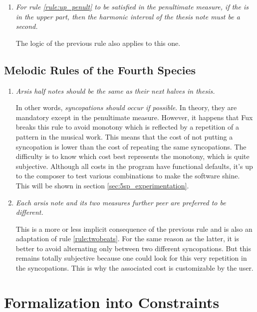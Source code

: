 \begin{enumerate}[wide, label=\bfseries 4.H\arabic*]
    \item\label{rule:uppenult4th} \textit{For rule \ref{rule:up_penult} to be satisfied in the penultimate measure, if the \cf is in the upper part, then the harmonic interval of the thesis note must be a second.}
    
    The logic of the previous rule also applies to this one.
\end{enumerate}

\subsection{Melodic Rules of the Fourth Species}
\begin{enumerate}[wide, label=\bfseries 4.M\arabic*]
    \item\label{rule:fullsyncopations} \textit{Arsis half notes should be the same as their next halves in thesis.}
    
    In other words, \textit{syncopations should occur if possible}. In theory, they are mandatory except in the penultimate measure. However, it happens that Fux breaks this rule to avoid monotony which is reflected by a repetition of a pattern in the musical work. This means that the cost of not putting a syncopation is lower than the cost of repeating the same syncopations. The difficulty is to know which cost best represents the monotony, which is quite subjective. Although all costs in the program have functional defaults, it's up to the composer to test various combinations to make the software shine. This will be shown in section \ref{sec:5sp_experimentation}.

    \item\label{rule:m2same} \textit{Each arsis note and its two measures further peer are preferred to be different.}

    This is a more or less implicit consequence of the previous rule and is also an adaptation of rule \ref{rule:twobeats}. For the same reason as the latter, it is better to avoid alternating only between two different syncopations. But this remains totally subjective because one could look for this very repetition in the syncopations. This is why the associated cost is customizable by the user.
\end{enumerate}

\section{Formalization into Constraints}

